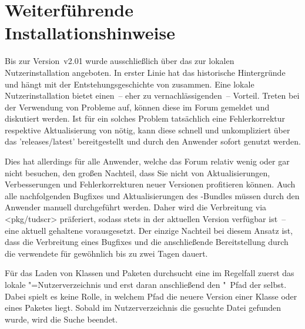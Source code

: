 \chapter{%
  Weiterführende Installationshinweise%
  \label{sec:install:ext}%
}

\NewDocumentCommand{}%

\bigskip\noindent
Bis zur Version~v2.01 wurde \TUDScript ausschließlich über das \Forum zur 
lokalen Nutzerinstallation angeboten. In erster Linie hat das historische 
Hintergründe und hängt mit der Entstehungsgeschichte von \TUDScript zusammen. 
Eine lokale Nutzerinstallation bietet einen~-- eher zu vernachlässigenden~-- 
Vorteil. Treten bei der Verwendung von \TUDScript Probleme auf, können diese im 
Forum gemeldet und diskutiert werden. Ist für ein solches Problem tatsächlich 
eine Fehlerkorrektur respektive Aktualisierung von \TUDScript nötig, kann diese 
schnell und unkompliziert über das \GitHubRepo'releases/latest' bereitgestellt 
und durch den Anwender sofort genutzt werden.

Dies hat allerdings für alle Anwender, welche das Forum relativ wenig oder gar 
nicht besuchen, den großen Nachteil, dass Sie nicht von Aktualisierungen, 
Verbesserungen und Fehlerkorrekturen neuer Versionen profitieren können. Auch 
alle nachfolgenden Bugfixes und Aktualisierungen des \TUDScript-Bundles müssen 
durch den Anwender manuell durchgeführt werden. Daher wird die Verbreitung via 
\CTAN<pkg/tudscr> präferiert, sodass \TUDScript stets in der aktuellen Version 
verfügbar ist~-- eine aktuell gehaltene \Distro vorausgesetzt. Der einzige 
Nachteil bei diesem Ansatz ist, dass die Verbreitung eines Bugfixes und die 
anschließende Bereitstellung durch die verwendete \Distro für gewöhnlich bis zu 
zwei Tagen dauert.

Für das Laden von Klassen und Paketen durchsucht eine \Distro im Regelfall 
zuerst das lokale "=Nutzerverzeichnis und erst daran anschließend 
den "~Pfad der \Distro selbst. Dabei spielt es keine Rolle, in 
welchem Pfad die neuere Version einer Klasse oder eines Paketes liegt. Sobald 
im Nutzerverzeichnis die gesuchte Datei gefunden wurde, wird die Suche beendet.

